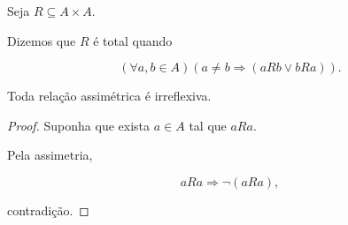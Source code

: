 \documentclass[../../main]{subfiles}
\begin{document}
\begin{defn}
	\label{def:matematica:relacoes:propriedades:total}

	Seja \(R\subseteq A\times A\).

	Dizemos que \(R\) é total quando

	\[
		(\forall a,b\in A)
		(a\neq b
		\Rightarrow
		(aRb \lor bRa)).
	\]

\end{defn}

\begin{prop}

	Toda relação assimétrica é irreflexiva.

\end{prop}

\begin{proof}

	Suponha que exista \(a\in A\) tal que \(aRa\).

	Pela assimetria,

	\[
		aRa
		\Rightarrow
		\neg(aRa),
	\]

	contradição.

\end{proof}
\end{document}
